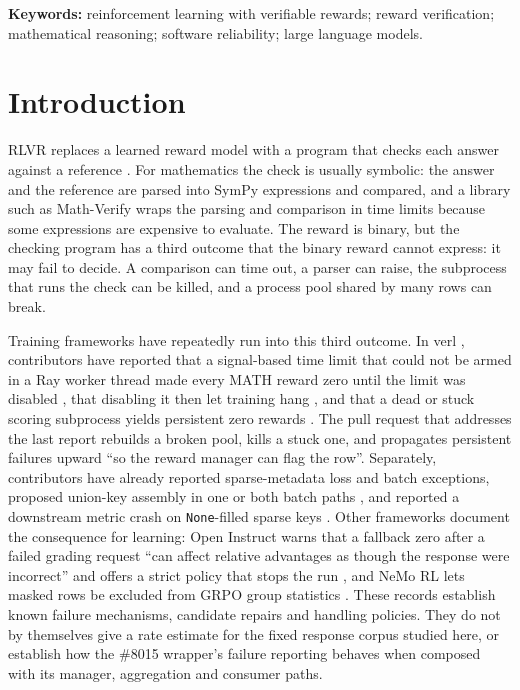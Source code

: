 \documentclass[10pt,a4paper]{article}
\let\cite\citep
\newcommand{\mv}{Math-Verify}
\begin{document}
\noindent\textbf{Keywords:} reinforcement learning with verifiable rewards;
reward verification; mathematical reasoning; software reliability; large language models.

\section{Introduction}

RLVR replaces a learned reward model with a program that checks each answer
against a reference \cite{lambert2024tulu3,shao2024deepseekmath,deepseek2025r1}.
For mathematics the check is usually symbolic: the answer and the reference
are parsed into SymPy expressions and compared, and a library such as
\mv{} \cite{mathverify} wraps the parsing and comparison in time limits
because some expressions are expensive to evaluate. The reward is binary,
but the checking program has a third outcome that the binary reward cannot
express: it may fail to decide. A comparison can time out, a parser can
raise, the subprocess that runs the check can be killed, and a process
pool shared by many rows can break.

Training frameworks have repeatedly run into this third outcome. In verl \cite{sheng2024hybridflow}, contributors have reported that a
signal-based time limit that could not be armed in a Ray worker thread made
every MATH reward zero until the limit was disabled \cite{verl5635}, that
disabling it then let training hang \cite{verl5839}, and that a dead or stuck
scoring subprocess yields persistent zero rewards \cite{verl8011}. The pull request that addresses the last report
\cite{verl8015} rebuilds a broken pool, kills a stuck one, and propagates
persistent failures upward ``so the reward manager can flag the row''.
Separately, contributors have already reported sparse-metadata loss and
batch exceptions, proposed union-key assembly in one or both batch
paths \cite{verl6545,verl7151}, and reported a downstream metric crash on
\texttt{None}-filled sparse keys \cite{verl6830,verl6845}. Other frameworks
document the consequence for learning: Open Instruct warns that a fallback
zero after a failed grading request ``can affect relative advantages as
though the response were incorrect'' and offers a strict policy that stops
the run \cite{openinstruct2026failure}, and NeMo RL lets masked rows be
excluded from GRPO group statistics \cite{nemorl2026masked}. These records
establish known failure mechanisms, candidate repairs and handling policies. They do not by themselves give a rate
estimate for the fixed response corpus studied here, or establish how
the \#8015 wrapper's failure reporting behaves when composed with its
manager, aggregation and consumer paths.
\end{document}
